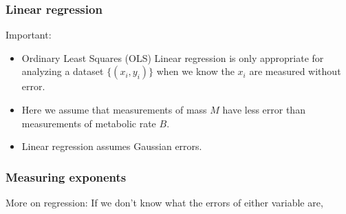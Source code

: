 \begin{frame}
  \frametitle{Linear regression}

  \begin{block}{Important:}
    \begin{itemize}
    \item<1-> 
      Ordinary Least Squares (OLS) Linear regression 
      is only appropriate for analyzing
      a dataset $\{(x_i,y_i)\}$
      when we know the $x_i$ are measured without error.
    \item<2-> 
      Here we assume that measurements of mass $M$
      have less error than measurements of metabolic rate $B$.
    \item<3-> 
      Linear regression assumes Gaussian errors.
    \end{itemize}
  \end{block}

\end{frame}



\begin{frame}
  \frametitle{Measuring exponents}

  \begin{block}{More on regression:}
    If  we don't know what the errors of either variable are,\\
    \medskip
    \medskip
    \medskip
  \end{block}
\end{frame}

